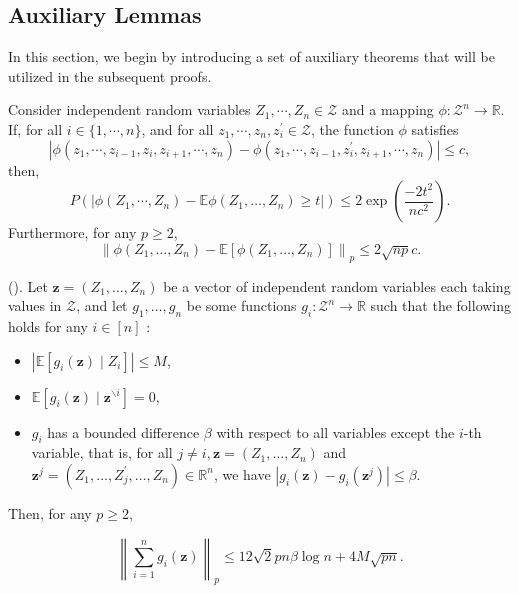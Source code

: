 \subsection{Auxiliary Lemmas}
In this section, we begin by introducing a set of auxiliary theorems that will be utilized in the subsequent proofs.
\begin{lemma}\label{Mcdiarmid}
 Consider independent random variables $Z_1, \cdots, Z_n \in \mathcal{Z}$ and a mapping $\phi: \mathcal{Z}^n \rightarrow \mathbb{R}$. If, for all $i \in\{1, \cdots, n\}$, and for all $z_1, \cdots, z_n, z_i^{\prime} \in \mathcal{Z}$, the function $\phi$ satisfies
$$
\left|\phi\left(z_1, \cdots, z_{i-1}, z_i, z_{i+1}, \cdots, z_n\right)-\phi\left(z_1, \cdots, z_{i-1}, z_i^{\prime}, z_{i+1}, \cdots, z_n\right)\right| \leq c,
$$
then,
$$
P\left(|\phi\left(Z_1, \cdots, Z_n\right)-\mathbb{E} \phi\left(Z_1, \ldots, Z_n\right) \geq t|\right) \leq 2\exp \left(\frac{-2 t^2}{n c^2}\right).
$$
Furthermore, for any $p \geq 2$,
$$
\left\|\phi\left(Z_1, \ldots, Z_n\right)-\mathbb{E}\left[\phi\left(Z_1, \ldots, Z_n\right)\right]\right\|_p \leq 2\sqrt{np}c.
$$
\end{lemma}
\begin{lemma}(\citep{bousquet2020sharper}).\label{theorem_moment} Let $\boldsymbol{z}=\left(Z_1, \ldots, Z_n\right)$ be a vector of independent random variables each taking values in $\mathcal{Z}$, and let $g_1, \ldots, g_n$ be some functions $g_i: \mathcal{Z}^n \rightarrow \mathbb{R}$ such that the following holds for any $i \in[n]$ :
\begin{itemize} 
    \item $\left|\mathbb{E}\left[g_i(\boldsymbol{z}) \mid Z_i\right]\right| \leq M$,
    \item  $\mathbb{E}\left[g_i(\boldsymbol{z}) \mid \boldsymbol{z}^{\backslash i}\right]=0$,
    \item  $g_i$ has a bounded difference $\beta$ with respect to all variables except the $i$-th variable, that is, for all $j \neq i, \boldsymbol{z}=\left(Z_1, \ldots, Z_n\right)$ and $\boldsymbol{z}^j=\left(Z_1, \ldots, Z_j^{\prime}, \ldots, Z_n\right) \in \mathbb{R}^n$, we have $\left|g_i(\boldsymbol{z})-g_i\left(\boldsymbol{z}^j\right)\right| \leq \beta$.
\end{itemize}
Then, for any $p \geq 2$,

$$
\left\|\sum_{i=1}^n g_i(\boldsymbol{z})\right\|_p \leq 12 \sqrt{2} p n \beta \log n+4 M \sqrt{p n}.
$$
\end{lemma} 

